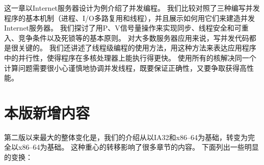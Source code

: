 {{\begin{description}
{            }
            \item[第12章：并发编程]
            {
                这一章以Internet服务器设计为例介绍了并发编程。
                我们比较对照了三种编写并发程序的基本机制（进程、I/O多路复用和线程），并且展示如何用它们来建造并发Internet服务器。
                我们探讨了用P、V信号量操作来实现同步、线程安全和可重入、竞争条件以及死锁等的基本原则。
                对大多数服务器应用来说，写并发代码都是很关键的。
                我们还讲述了线程级编程的使用方法，用这种方法来表达应用程序中的并行性，使得程序在多核处理器上能执行得更快。
                使用所有的核解决同一个计算问题需要很小心谨慎地协调并发线程，既要保证正确性，又要争取获得高性能。
            }
        \end{description}
    }

    \section{本版新增内容}
    {
        第二版以来最大的整体变化是，我们的介绍从以IA32和x86--64为基础，转变为完全以x86--64为基础。
        这种重心的转移影响了很多章节的内容。
        下面列出一些明显的变换：

}}
